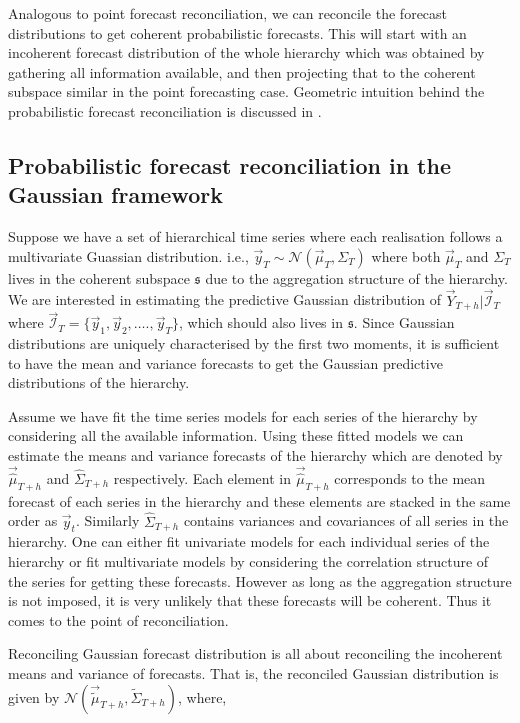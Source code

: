 \documentclass[graybox]{svmult}
\begin{document}
Analogous to point forecast reconciliation, we can reconcile the forecast distributions to get coherent probabilistic forecasts. This will start with an incoherent forecast distribution of the whole hierarchy which was obtained by gathering all information available, and then projecting that to the coherent subspace similar in the point forecasting case. Geometric intuition behind the probabilistic forecast reconciliation is discussed in \cite{Gamakumara2018}. 

\subsection{Probabilistic forecast reconciliation in the Gaussian framework}

Suppose we have a set of hierarchical time series where each realisation follows a multivariate Guassian distribution. i.e., $\vec{y}_T \sim \mathscr{N}(\vec{\mu}_T, \Sigma_T)$ where both $\vec{\mu}_T$ and $\Sigma_T$ lives in the coherent subspace $\mathfrak{s}$ due to the aggregation structure of the hierarchy. We are interested in estimating the predictive Gaussian distribution of $\vec{Y}_{T+h}| \vec{\mathscr{I}}_T$ where $\vec{\mathscr{I}}_T= \{\vec{y}_1,\vec{y}_2,\dots.,\vec{y}_T\}$, which should also lives in $\mathfrak{s}$. Since Gaussian distributions are uniquely characterised by the first two moments, it is sufficient to have the mean and variance forecasts to get the Gaussian predictive distributions of the hierarchy.

Assume we have fit the time series models for each series of the hierarchy by considering all the available information. Using these fitted models we can estimate the means and variance forecasts of the hierarchy which are denoted by $\vec{\hat{\mu}}_{T+h}$ and $\hat{\Sigma}_{T+h}$ respectively. Each element in $\vec{\hat{\mu}}_{T+h}$ corresponds to the mean forecast of each series in the hierarchy and these elements are stacked in the same order as $\vec{y}_t$. Similarly $\hat{\Sigma}_{T+h}$ contains variances and covariances of all series in the hierarchy. One can either fit univariate models for each individual series of the hierarchy or fit multivariate models by considering the correlation structure of the series for getting these forecasts. However as long as the aggregation structure is not imposed, it is very unlikely that these forecasts will be coherent. Thus it comes to the point of reconciliation. 

Reconciling Gaussian forecast distribution is all about reconciling the incoherent means and variance of forecasts. That is, the reconciled Gaussian distribution is given by $\mathscr{N}(\vec{\tilde{\mu}}_{T+h}, \tilde{\Sigma}_{T+h})$, where, 
\end{document}
